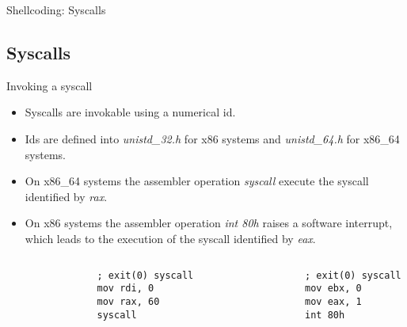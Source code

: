 \begin{frame}[fragile]{Shellcoding: Syscalls}
	\subsection{Syscalls}
	\begin{block}{Invoking a syscall}
		\begin{itemize}
			\item Syscalls are invokable using a numerical id.
			\item Ids are defined into \emph{unistd\_32.h} for x86 systems and \emph{unistd\_64.h} for x86\_64 systems.
			\item On x86\_64 systems the assembler operation \emph{syscall} execute the syscall identified by \emph{rax}.
			\item On x86 systems the assembler operation \emph{int 80h} raises a software interrupt, which leads to the execution
				of the syscall identified by \emph{eax}.
		\end{itemize}
	\end{block}
	\acode
	\begin{columns}[T]
		\begin{column}{.4\textwidth}
			\begin{lstlisting}
				; exit(0) syscall
				mov rdi, 0
				mov rax, 60
				syscall
			\end{lstlisting}
		\end{column}
		\begin{column}{.4\textwidth}
			\begin{lstlisting}
				; exit(0) syscall
				mov ebx, 0
				mov eax, 1
				int 80h
			\end{lstlisting}
		\end{column}
	\end{columns}
\end{frame}

